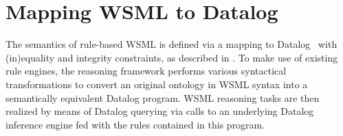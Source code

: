 \newcommand{\smtxtit}[1]{\ensuremath{\textit{\scriptsize{#1}}}}
\newcommand{\trans}[1]{\ensuremath{\tau_{#1}}\xspace}
\newcommand{\transtxt}[1]{\trans{\smtxtit{#1}}}
\def\transax{\transtxt{axioms}}
\def\transnorm{\transtxt{n}}
\def\translt{\transtxt{lt}}
\def\transdlog{\transtxt{dlog}}

\def\LE{\ensuremath{\mathcal{L\!E}}\xspace}
\def\O{\ensuremath{\mathcal{O}}\xspace}
\def\P{\ensuremath{\mathcal{P}}\xspace}
\newcommand{\powset}[1]{\ensuremath{2^{#1}}\xspace}
\def\lprl{\ensuremath{\;:\!-\:}}
\def\cstr{\ensuremath{\;!-\:}}
\def\qury{\ensuremath{\;?-\:}}
\def\dlogrule{\lprl}
\def\dlogcstr{\square\lprl}
\def\dlogand{\wedge}
\def\dlognot{\sim}
\newcommand{\dlogfact}[1]{\ensuremath{{#1}\;.}}

\newcommand{\predicate}[1]{\ensuremath{p_{#1}}\xspace}
\newcommand{\predsubtxt}[1]{\mathrm{\sf #1}}
\def\psco{\predicate{\predsubtxt{sco}}}
\def\pmo{\predicate{\predsubtxt{mo}}}
\def\phval{\predicate{\predsubtxt{hval}}}
\def\pitype{\predicate{\predsubtxt{itype}}}
\def\potype{\predicate{\predsubtxt{otype}}}
\def\mlaxioms{\ensuremath{P_{\smtxtit{meta}}}\xspace}

\newcommand{\typeof}{\ensuremath{\textit{typeOf}}\xspace}

\def\bla{\textbf{{\sf bla}}\xspace}

\section{Mapping WSML to Datalog\vspace{-1.5mm}\label{sec:mapping}}

The semantics of rule-based WSML is defined via a mapping to
Datalog~\cite{datalog} with (in)equality and integrity
constraints, as described in \cite{wsml-spec}. To make use of
existing rule engines, the reasoning framework performs various
syntactical transformations to convert an original ontology in
WSML syntax into a semantically equivalent Datalog program. WSML
reasoning tasks are then realized by means of Datalog querying via
calls to an underlying Datalog inference engine fed with the rules
contained in this program.





